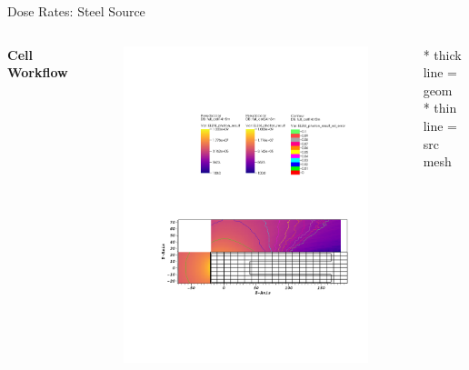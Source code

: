 \documentclass{beamer}
\begin{document}
\begin{frame}{Dose Rates: Steel Source}
\begin{columns}[T]
        \textbf{Cell Workflow}
        \begin{figure}
                \centering
                \includegraphics[scale=0.49,trim={2.5cm 6cm 1cm 15cm},clip]{figs/dose_steel_cell_novoid.pdf}
        \end{figure}


	\tiny{* thick line = geom} \\
	\tiny{* thin line = src mesh}


\end{columns}
\end{frame}
\end{document}
